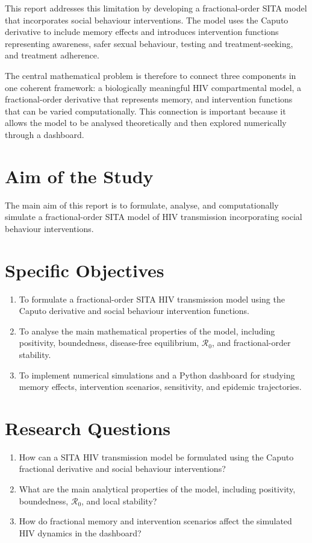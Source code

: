 \documentclass[12pt,a4paper,oneside]{report}
\newcommand{\Rzero}{\mathcal{R}_0}
\begin{document}
This report addresses this limitation by developing a fractional-order SITA model that incorporates social behaviour interventions. The model uses the Caputo derivative to include memory effects and introduces intervention functions representing awareness, safer sexual behaviour, testing and treatment-seeking, and treatment adherence.

The central mathematical problem is therefore to connect three components in one coherent framework: a biologically meaningful HIV compartmental model, a fractional-order derivative that represents memory, and intervention functions that can be varied computationally. This connection is important because it allows the model to be analysed theoretically and then explored numerically through a dashboard.

\newpage

\section{Aim of the Study}
The main aim of this report is to formulate, analyse, and computationally simulate a fractional-order SITA model of HIV transmission incorporating social behaviour interventions.

\section{Specific Objectives}
\begin{enumerate}
  \item To formulate a fractional-order SITA HIV transmission model using the Caputo derivative and social behaviour intervention functions.
  \item To analyse the main mathematical properties of the model, including positivity, boundedness, disease-free equilibrium, $\Rzero$, and fractional-order stability.
  \item To implement numerical simulations and a Python dashboard for studying memory effects, intervention scenarios, sensitivity, and epidemic trajectories.
\end{enumerate}

\section{Research Questions}
\begin{enumerate}
  \item How can a SITA HIV transmission model be formulated using the Caputo fractional derivative and social behaviour interventions?
  \item What are the main analytical properties of the model, including positivity, boundedness, $\Rzero$, and local stability?
  \item How do fractional memory and intervention scenarios affect the simulated HIV dynamics in the dashboard?
\end{enumerate}
\end{document}
